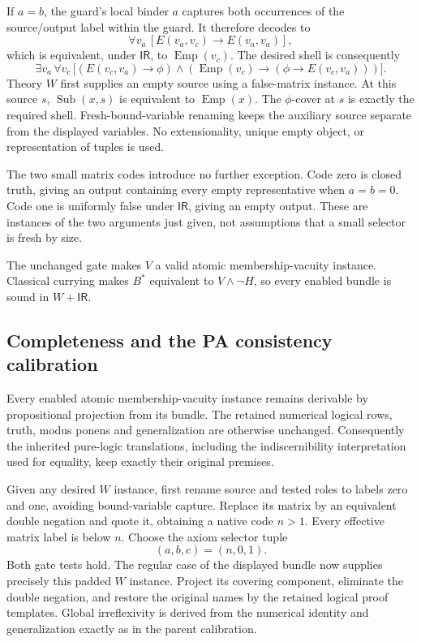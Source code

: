 If $a=b$, the guard's local binder $a$ captures both occurrences of
the source/output label within the guard. It therefore decodes to
\[
 \forall v_a\,[E(v_a,v_c)\to E(v_a,v_a)],
\]
which is equivalent, under $\mathsf{IR}$, to
$\operatorname{Emp}(v_c)$. The desired shell is consequently
\[
 \exists v_a\,\forall v_c\,
 \bigl[(E(v_c,v_a)\to\phi)\land
       (\operatorname{Emp}(v_c)\to(\phi\to E(v_c,v_a)))\bigr].
\]
Theory $W$ first supplies an empty source using a false-matrix
instance. At this source $s$, $\operatorname{Sub}(x,s)$ is equivalent
to $\operatorname{Emp}(x)$. The $\phi$-cover at $s$ is exactly the
required shell. Fresh-bound-variable renaming keeps the auxiliary
source separate from the displayed variables. No extensionality,
unique empty object, or representation of tuples is used.

The two small matrix codes introduce no further exception. Code zero
is closed truth, giving an output containing every empty representative
when $a=b=0$. Code one is uniformly false under $\mathsf{IR}$, giving
an empty output. These are instances of the two arguments just given,
not assumptions that a small selector is fresh by size.

The unchanged gate makes $V$ a valid atomic membership-vacuity
instance. Classical currying makes $B^*$ equivalent to
$V\land\neg H$, so every enabled bundle is sound in $W+\mathsf{IR}$.

\subsection{Completeness and the PA consistency calibration}

Every enabled atomic membership-vacuity instance remains derivable by
propositional projection from its bundle. The retained numerical
logical rows, truth, modus ponens and generalization are otherwise
unchanged. Consequently the inherited pure-logic translations, including
the indiscernibility interpretation used for equality, keep exactly
their original premises.

Given any desired $W$ instance, first rename source and tested roles to
labels zero and one, avoiding bound-variable capture. Replace its matrix
by an equivalent double negation and quote it, obtaining a native code
$n>1$. Every effective matrix label is below $n$. Choose the axiom
selector tuple
\[
                  (a,b,c)=(n,0,1).
\]
Both gate tests hold. The regular case of the displayed bundle now
supplies precisely this padded $W$ instance. Project its covering
component, eliminate the double negation, and restore the original
names by the retained logical proof templates. Global irreflexivity is
derived from the numerical identity and generalization exactly as in
the parent calibration.

